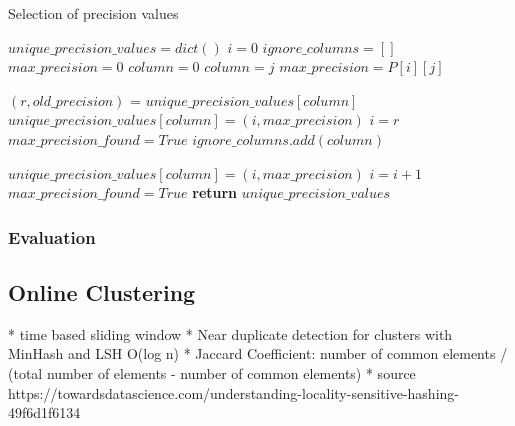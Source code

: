 \begin{algorithm}
    \caption{Selection of precision values}\label{alg:selection}
    \begin{algorithmic}[1]
    \State $unique\_precision\_values = dict()$
    \State $i = 0$
            \State $ignore\_columns = []$
            \State $max\_precision = 0$
            \State $column = 0$
                \State $column = j$
                \State $max\_precision = P[i][j]$
                \EndIf
            \EndFor

                    \State $(r, old\_precision)$ = $unique\_precision\_values[column]$
                    \State $unique\_precision\_values[column] = (i, max\_precision)$
                    \State $i = r$
                    \State $max\_precision\_found = True$
                \Else
                    \State $ignore\_columns.add(column)$
                \EndIf

            \Else
                \State $unique\_precision\_values[column] = (i, max\_precision)$
                \State $i = i + 1$
                \State $max\_precision\_found = True$
            \EndIf
    \EndWhile
    \EndWhile
    \State \textbf{return} $unique\_precision\_values$
    \EndProcedure
    \end{algorithmic}
\end{algorithm}
    
\subsubsection{Evaluation}


\subsection{Online Clustering}

* time based sliding window
* Near duplicate detection for clusters with MinHash and LSH O(log n)
* Jaccard Coefficient: number of common elements / (total number of elements - number of common elements)
* source https://towardsdatascience.com/understanding-locality-sensitive-hashing-49f6d1f6134

